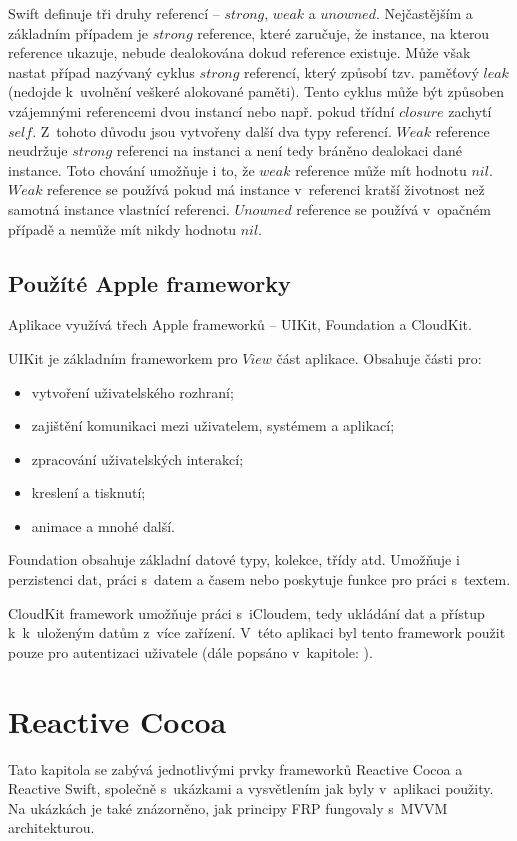 \documentclass[thesis=M,czech]{FITthesis}[2012/06/26]
\begin{document}
Swift definuje tři druhy referencí -- $strong$, $weak$ a $unowned$. Nejčastějším a základním případem je $strong$ reference, které zaručuje, že instance, na kterou reference ukazuje, nebude dealokována dokud reference existuje. Může však nastat případ nazývaný cyklus $strong$ referencí, který způsobí tzv. paměťový $leak$ (nedojde k~uvolnění veškeré alokované paměti). Tento cyklus může být způsoben vzájemnými referencemi dvou instancí nebo např. pokud třídní $closure$ zachytí $self$. Z~tohoto důvodu jsou vytvořeny další dva typy referencí. $Weak$ reference neudržuje $strong$ referenci na instanci a není tedy bráněno dealokaci dané instance. Toto chování umožňuje i to, že $weak$ reference může mít hodnotu $nil$. $Weak$ reference se používá pokud má instance v~referenci kratší životnost než samotná instance vlastnící referenci. $Unowned$ reference se používá v~opačném případě a nemůže mít nikdy hodnotu $nil$. \cite{devMemory}

\subsection{Použíté Apple frameworky}
Aplikace využívá třech Apple frameworků -- UIKit, Foundation a CloudKit.

UIKit je základním frameworkem pro $View$ část aplikace. Obsahuje části pro:
\begin{itemize}
\item vytvoření uživatelského rozhraní;
\item zajištění komunikaci mezi uživatelem, systémem a aplikací;
\item zpracování uživatelských interakcí;
\item kreslení a tisknutí;
\item animace a mnohé další. \cite{UIKit}
\end{itemize} 

Foundation obsahuje základní datové typy, kolekce, třídy atd. Umožňuje i perzistenci dat, práci s~datem a časem nebo poskytuje funkce pro práci s~textem. \cite{foundation}

CloudKit framework umožňuje práci s~iCloudem, tedy ukládání dat a přístup k~k~uloženým datům z~více zařízení. V~této aplikaci byl tento framework použit pouze pro autentizaci uživatele (dále popsáno v~kapitole: ).

\section{Reactive Cocoa}
Tato kapitola se zabývá jednotlivými prvky frameworků Reactive Cocoa a Reactive Swift, společně s~ukázkami a vysvětlením jak byly v~aplikaci použity. Na ukázkách je také znázorněno, jak principy FRP fungovaly s~MVVM architekturou.
\end{document}
